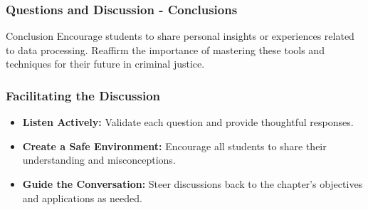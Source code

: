 \documentclass[aspectratio=169]{beamer}
\begin{document}
\begin{frame}[fragile]
    \frametitle{Questions and Discussion - Conclusions}
    \begin{block}{Conclusion}
        Encourage students to share personal insights or experiences related to data processing. 
        Reaffirm the importance of mastering these tools and techniques for their future in criminal justice.
    \end{block}
\end{frame}

\begin{frame}[fragile]
    \frametitle{Facilitating the Discussion}
    \begin{itemize}
        \item \textbf{Listen Actively:} Validate each question and provide thoughtful responses.
        \item \textbf{Create a Safe Environment:} Encourage all students to share their understanding and misconceptions.
        \item \textbf{Guide the Conversation:} Steer discussions back to the chapter's objectives and applications as needed.
    \end{itemize}
\end{frame}
\end{document}
